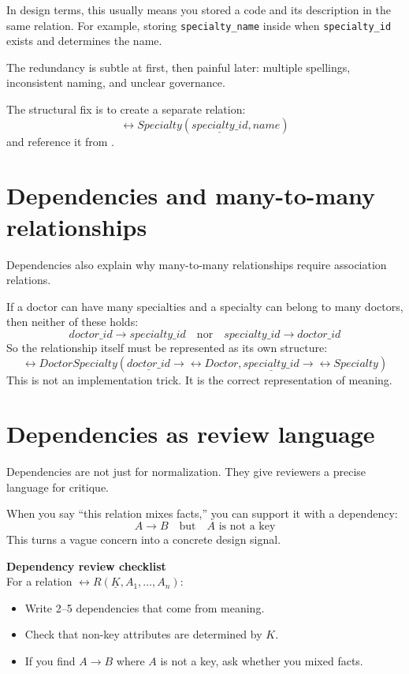 In design terms, this usually means you stored a code and its description in the same relation.
For example, storing \texttt{specialty\_name} inside  when \texttt{specialty\_id} exists and determines the name.

The redundancy is subtle at first, then painful later:
multiple spellings, inconsistent naming, and unclear governance.

The structural fix is to create a separate relation:
\[
\rel{Specialty}(\underline{specialty\_id}, name)
\]
and reference it from .

\section{Dependencies and many-to-many relationships}
Dependencies also explain why many-to-many relationships require association relations.

If a doctor can have many specialties and a specialty can belong to many doctors, then neither of these holds:
\[
doctor\_id \rightarrow specialty\_id
\quad \text{nor} \quad
specialty\_id \rightarrow doctor\_id
\]
So the relationship itself must be represented as its own structure:
\[
\rel{DoctorSpecialty}(\underline{doctor\_id} \rightarrow \rel{Doctor}, \underline{specialty\_id} \rightarrow \rel{Specialty})
\]
This is not an implementation trick.
It is the correct representation of meaning.

\section{Dependencies as review language}
Dependencies are not just for normalization.
They give reviewers a precise language for critique.

When you say “this relation mixes facts,” you can support it with a dependency:
\[
A \rightarrow B \quad \text{but} \quad A \text{ is not a key}
\]
This turns a vague concern into a concrete design signal.

\begin{principlebox}
\textbf{Dependency review checklist}\\
For a relation \(\rel{R}(\underline{K}, A_1, \dots, A_n)\):
\begin{itemize}[leftmargin=*,nosep]
  \item Write 2--5 dependencies that come from meaning.
  \item Check that non-key attributes are determined by \(K\).
  \item If you find \(A \rightarrow B\) where \(A\) is not a key, ask whether you mixed facts.
\end{itemize}
\end{principlebox}

